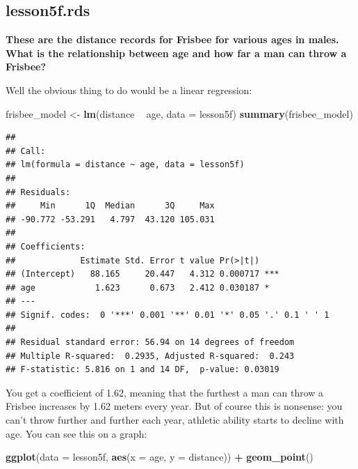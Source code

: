 \documentclass[]{book}
\newenvironment{Shaded}{\begin{snugshade}}{\end{snugshade}}
\newcommand{\DataTypeTok}[1]{\textcolor[rgb]{0.13,0.29,0.53}{#1}}
\newcommand{\KeywordTok}[1]{\textcolor[rgb]{0.13,0.29,0.53}{\textbf{#1}}}
\newcommand{\NormalTok}[1]{#1}
\newcommand{\OperatorTok}[1]{\textcolor[rgb]{0.81,0.36,0.00}{\textbf{#1}}}
\newcommand{\StringTok}[1]{\textcolor[rgb]{0.31,0.60,0.02}{#1}}
\begin{document}
\hypertarget{lesson5f.rds}{%
\subsection{lesson5f.rds}\label{lesson5f.rds}}

\textbf{These are the distance records for Frisbee for various ages in
males. What is the relationship between age and how far a man can throw
a Frisbee?}

Well the obvious thing to do would be a linear regression:

\begin{Shaded}
\begin{Highlighting}[]
\NormalTok{frisbee_model <-}\StringTok{ }\KeywordTok{lm}\NormalTok{(distance }\OperatorTok{~}\StringTok{ }\NormalTok{age,}
                    \DataTypeTok{data =}\NormalTok{ lesson5f)}
\KeywordTok{summary}\NormalTok{(frisbee_model)}
\end{Highlighting}
\end{Shaded}

\begin{verbatim}
## 
## Call:
## lm(formula = distance ~ age, data = lesson5f)
## 
## Residuals:
##     Min      1Q  Median      3Q     Max 
## -90.772 -53.291   4.797  43.120 105.031 
## 
## Coefficients:
##             Estimate Std. Error t value Pr(>|t|)    
## (Intercept)   88.165     20.447   4.312 0.000717 ***
## age            1.623      0.673   2.412 0.030187 *  
## ---
## Signif. codes:  0 '***' 0.001 '**' 0.01 '*' 0.05 '.' 0.1 ' ' 1
## 
## Residual standard error: 56.94 on 14 degrees of freedom
## Multiple R-squared:  0.2935, Adjusted R-squared:  0.243 
## F-statistic: 5.816 on 1 and 14 DF,  p-value: 0.03019
\end{verbatim}

You get a coefficient of 1.62, meaning that the furthest a man can throw
a Frisbee increases by 1.62 meters every year. But of course this is
nonsense: you can't throw further and further each year, athletic
ability starts to decline with age. You can see this on a graph:

\begin{Shaded}
\begin{Highlighting}[]
\KeywordTok{ggplot}\NormalTok{(}\DataTypeTok{data =}\NormalTok{ lesson5f,}
       \KeywordTok{aes}\NormalTok{(}\DataTypeTok{x =}\NormalTok{ age, }\DataTypeTok{y =}\NormalTok{ distance)) }\OperatorTok{+}\StringTok{ }
\StringTok{  }\KeywordTok{geom_point}\NormalTok{()}
\end{Highlighting}
\end{Shaded}
\end{document}
